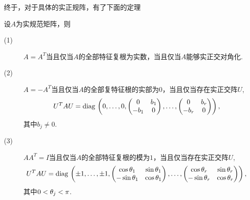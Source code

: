 终于，对于具体的实正规阵，有了下面的定理
\begin{thm}
	设$A$为实规范矩阵，则
	\begin{description}
	\item[(1)] $A=A^T$当且仅当$A$的全部特征复根为实数，当且仅当$A$能够实正交对角化.
	\item[(2)] $A=-A^T$当且仅当$A$的全部复特征根的实部为$0$，当且仅当存在实正交阵$U$,
	\[U^T A U=\operatorname*{diag\,}\left(0,\dots,0,
	\begin{pmatrix} 0 & b_1\\ -b_1 & 0\end{pmatrix},\dots,\begin{pmatrix} 0 & b_r\\ -b_r & 0\end{pmatrix}\right),\]
	其中$b_j\neq 0$.
	\item[(3)] $AA^T=I$当且仅当$A$的全部特征复根的模为$1$，当且仅当存在实正交阵$U$,
	\[U^T A U=\operatorname*{diag\,}\left(\pm 1,\dots,\pm 1,
	\begin{pmatrix} \cos\theta_1 & \sin\theta_1\\ -\sin\theta_1 & \cos\theta_1\end{pmatrix},\dots,\begin{pmatrix} \cos\theta_r & \sin\theta_r\\ -\sin\theta_r & \cos\theta_r\end{pmatrix}\right),\]
	其中$0<\theta_j<\pi$.
	\end{description}
\end{thm}
